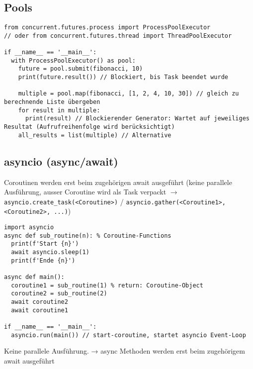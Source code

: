 \subsection{Pools}

\begin{lstlisting}
from concurrent.futures.process import ProcessPoolExecutor
// oder from concurrent.futures.thread import ThreadPoolExecutor

if __name__ == '__main__':
  with ProcessPoolExecutor() as pool:
  	future = pool.submit(fibonacci, 10)
  	print(future.result()) // Blockiert, bis Task beendet wurde

  	multiple = pool.map(fibonacci, [1, 2, 4, 10, 30]) // gleich zu berechnende Liste übergeben
  	for result in multiple:
  	  print(result) // Blockierender Generator: Wartet auf jeweiliges Resultat (Aufrufreihenfolge wird berücksichtigt)
    all_results = list(multiple) // Alternative
\end{lstlisting}

\subsection{asyncio (async/await)}

Coroutinen werden erst beim zugehörigen await ausgeführt (keine parallele Ausführung, ausser Coroutine wird als Task verpackt $\rightarrow$ \lstinline{asyncio.create_task(<Coroutine>)} / \lstinline{asyncio.gather(<Coroutine1>, <Coroutine2>, ...)})

\begin{lstlisting}
import asyncio
async def sub_routine(n): % Coroutine-Functions
  print(f'Start {n}')
  await asyncio.sleep(1)
  print(f'Ende {n}')

async def main():
  coroutine1 = sub_routine(1) % return: Coroutine-Object
  coroutine2 = sub_routine(2)
  await coroutine2
  await coroutine1

if __name__ == '__main__':
  asyncio.run(main()) // start-coroutine, startet asyncio Event-Loop
\end{lstlisting}
Keine parallele Ausführung. → async
Methoden werden erst beim zugehörigem await ausgeführt


